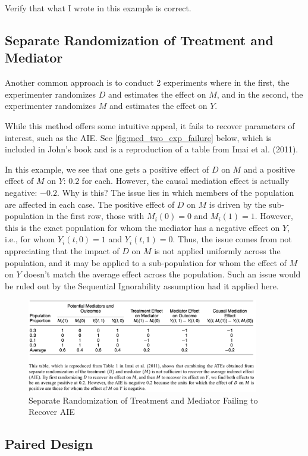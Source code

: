 \documentclass[10pt]{article}
\begin{document}
\begin{questions}
    Verify that what I wrote in this example is correct.
\end{questions}


\subsection{Separate Randomization of Treatment and Mediator}

Another common approach is to conduct 2 experiments where in the first, the 
experimenter
randomizes $D$ and estimates the effect on $M$, and in the second, 
the experimenter randomizes $M$ and estimates the effect on $Y$.

While this method offers some intuitive appeal, it fails to recover 
parameters of interest, such as the AIE.
See \autoref{fig:med_two_exp_failure} below,
which is included in John's book and is a 
reproduction of a table from Imai et al. (2011).

In this example, we 
see that one gets a positive effect of $D$ on $M$ and a positive effect of $M$ on $Y$:
$0.2$ for each. However, the causal mediation effect 
is actually negative: $-0.2$. Why is this? 
The issue lies in which members of the population 
are affected in each case. The positive effect of 
$D$ on $M$ is driven by the sub-population in the first row, those 
with $M_i(0) = 0$ and $M_i(1) = 1$. However, this is the exact 
population for whom the mediator has a negative effect on $Y$, i.e., for whom 
$Y_i(t,0) = 1$ and
$Y_i(t,1) = 0$. Thus, the issue comes from not appreciating 
that the impact of $D$ on $M$ is not applied uniformly across 
the population, and it may be applied to a sub-population 
for whom the effect of $M$ on $Y$ doesn't match the average effect 
across the population. Such an issue would be ruled out by 
the Sequential Ignorability assumption had it applied here.


\begin{figure}[!htb]
    \centering
        \includegraphics[width=0.9\textwidth]{../input/med_two_exp_failure.png}
    \caption{Separate Randomization of Treatment and Mediator Failing to Recover AIE}
    \label{fig:med_two_exp_failure}
\end{figure}

\subsection{Paired Design}
\end{document}
